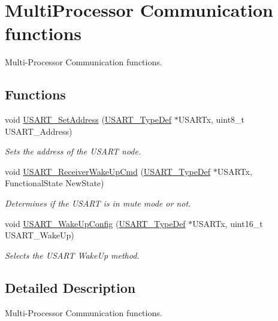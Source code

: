 \hypertarget{group___u_s_a_r_t___group3}{}\section{Multi\+Processor Communication functions}
\label{group___u_s_a_r_t___group3}


Multi-\/\+Processor Communication functions.  


\subsection*{Functions}
\begin{DoxyCompactItemize}
\item 
void \hyperlink{group___u_s_a_r_t___group3_ga65ec9928817f3f031dd9a4dfc95d6666}{U\+S\+A\+R\+T\+\_\+\+Set\+Address} (\hyperlink{struct_u_s_a_r_t___type_def}{U\+S\+A\+R\+T\+\_\+\+Type\+Def} $\ast$U\+S\+A\+R\+Tx, uint8\+\_\+t U\+S\+A\+R\+T\+\_\+\+Address)
\begin{DoxyCompactList}\small\item\em Sets the address of the U\+S\+A\+RT node. \end{DoxyCompactList}\item 
void \hyperlink{group___u_s_a_r_t___group3_gac27b78ce445a16fe33851d2f87781c02}{U\+S\+A\+R\+T\+\_\+\+Receiver\+Wake\+Up\+Cmd} (\hyperlink{struct_u_s_a_r_t___type_def}{U\+S\+A\+R\+T\+\_\+\+Type\+Def} $\ast$U\+S\+A\+R\+Tx, Functional\+State New\+State)
\begin{DoxyCompactList}\small\item\em Determines if the U\+S\+A\+RT is in mute mode or not. \end{DoxyCompactList}\item 
void \hyperlink{group___u_s_a_r_t___group3_ga4965417c2412c36e462fcad50a8d5393}{U\+S\+A\+R\+T\+\_\+\+Wake\+Up\+Config} (\hyperlink{struct_u_s_a_r_t___type_def}{U\+S\+A\+R\+T\+\_\+\+Type\+Def} $\ast$U\+S\+A\+R\+Tx, uint16\+\_\+t U\+S\+A\+R\+T\+\_\+\+Wake\+Up)
\begin{DoxyCompactList}\small\item\em Selects the U\+S\+A\+RT Wake\+Up method. \end{DoxyCompactList}\end{DoxyCompactItemize}


\subsection{Detailed Description}
Multi-\/\+Processor Communication functions. 


